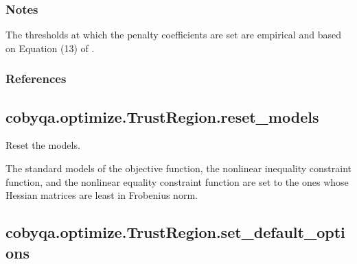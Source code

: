 \documentclass[letterpaper,10pt,english]{sphinxmanual}
\begin{document}
\begin{fulllineitems}
\begin{fulllineitems}
\subsubsection*{Notes}

\sphinxAtStartPar
The thresholds at which the penalty coefficients are set are empirical
and based on Equation (13) of .
\subsubsection*{References}

\sphinxAtStartPar
{}

\end{fulllineitems}



\subsection{cobyqa.optimize.TrustRegion.reset\_models}
\label{\detokenize{refs/generated/cobyqa.optimize.TrustRegion.reset_models:cobyqa-optimize-trustregion-reset-models}}\label{\detokenize{refs/generated/cobyqa.optimize.TrustRegion.reset_models::doc}}

\begin{fulllineitems}
\label{\detokenize{refs/generated/cobyqa.optimize.TrustRegion.reset_models:cobyqa.optimize.TrustRegion.reset_models}}
\sphinxAtStartPar
Reset the models.

\sphinxAtStartPar
The standard models of the objective function, the nonlinear inequality
constraint function, and the nonlinear equality constraint function are
set to the ones whose Hessian matrices are least in Frobenius norm.

\end{fulllineitems}



\subsection{cobyqa.optimize.TrustRegion.set\_default\_options}
\label{\detokenize{refs/generated/cobyqa.optimize.TrustRegion.set_default_options:cobyqa-optimize-trustregion-set-default-options}}\label{\detokenize{refs/generated/cobyqa.optimize.TrustRegion.set_default_options::doc}}


\end{fulllineitems}
\end{document}

